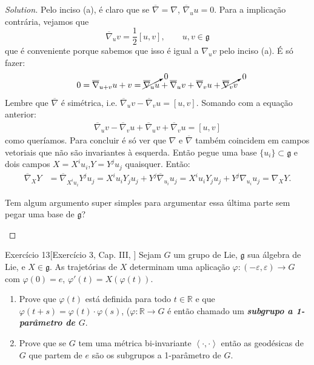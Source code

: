 \begin{proof}[Solution]
\item Pelo inciso (a), é claro que se  \(\overline{\nabla}=\nabla\), \(\overline{\nabla}_u u=0\). Para a implicação contrária, vejamos que
	\[\overline{\nabla}_uv=\frac{1}{2}[u,v],\qquad u,v \in \mathfrak{g}\]
	que é conveniente porque sabemos que isso é igual a \(\nabla_uv\) pelo inciso (a). É só fazer:
	\[0=\overline{\nabla}_{u+v}u+v=\cancelto{0}{\overline{\nabla}_u u}+\overline{\nabla}_uv+\overline{\nabla}_vu+\cancelto{0}{\overline{\nabla}_vv}\]
Lembre que \(\overline{\nabla}\) é simétrica, i.e. \(\overline{\nabla}_uv-\overline{\nabla}_vu=[u,v]\). Somando com a equação anterior:
\begin{align*}
	\overline{\nabla}_uv-\overline{\nabla}_vu+\overline{\nabla}_uv+\overline{\nabla}_vu=[u,v]
\end{align*}
como queríamos. Para concluir é só ver que \(\nabla\) e \(\overline{\nabla}\) também coincidem em campos vetoriais que não são invariantes à esquerda. Então pegue uma base \(\{u_i\}\subset \mathfrak{g}\) e dois campos \(X=X^iu_i\),\(Y=Y^ju_j\) quaisquer. Então:
\begin{align*}
\overline{\nabla}_XY&=\overline{\nabla}_{X^iu_i}Y^ju_j=X^iu_iY_ju_j+Y^j\overline{\nabla}_{u_i}u_j=X^iu_iY_ju_j+Y^j\nabla_{u_i}u_j=\nabla_XY.
\end{align*}
\begin{question}\leavevmode
Tem algum argumento super simples para argumentar essa última parte sem pegar uma base de \(\mathfrak{g}\)?
\end{question}
\end{proof}

\begin{thing4}{Exercício 13}[Exercício 3, Cap. III, \cite{doc}]\label{exer:13}\leavevmode
Sejam \(G\) um grupo de Lie,  \(\mathfrak{g}\) sua álgebra de Lie, e \(X \in \mathfrak{g}\). As trajetórias de \(X\) determinam uma aplicação \(\varphi:(-\varepsilon,\varepsilon)\to G\) com \(\varphi(0)=e\), \(\varphi'(t)=X(\varphi(t))\).
\begin{enumerate}[label=(\alph*)]
\item Prove que \(\varphi(t)\) está definida para todo \(t \in \mathbb{R}\) e que \(\varphi(t+s)=\varphi(t)\cdot\varphi(s)\), (\(\varphi:\mathbb{R} \to G\) é então chamado um \textit{\textbf{subgrupo a 1-parâmetro de \(G\)}}.
\item Prove que se \(G\) tem uma métrica bi-invariante \(\left<\cdot,\cdot\right>\) então as geodésicas de \(G\) que partem de \(e\) são os subgrupos a 1-parâmetro de \(G\).
\end{enumerate}
\end{thing4}

